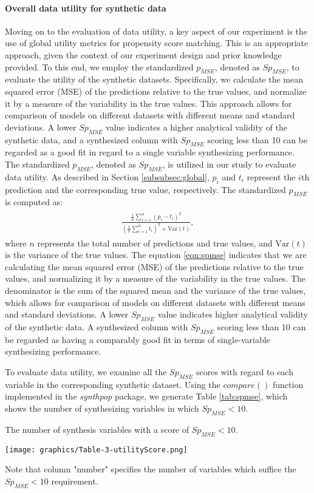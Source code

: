 \paragraph{Overall data utility for synthetic data}
Moving on to the evaluation of data utility, a key aspect of our experiment is the use of global utility metrics for propensity score matching. This is an appropriate approach, given the context of our experiment design and prior knowledge provided. To this end, we employ the standardized $p_{MSE}$, denoted as $Sp_{MSE}$, to evaluate the utility of the synthetic datasets. Specifically, we calculate the mean squared error (MSE) of the predictions relative to the true values, and normalize it by a measure of the variability in the true values. This approach allows for comparison of models on different datasets with different means and standard deviations. A lower $Sp_{MSE}$ value indicates a higher analytical validity of the synthetic data, and a synthesized column with $Sp_{MSE}$ scoring less than 10 can be regarded as a good fit in regard to a single variable synthesizing performance. The standardized $p_{MSE}$, denoted as $Sp_{MSE}$, is utilized in our study to evaluate data utility. As described in Section \ref{subsubsec:global}, $p_i$ and $t_i$ represent the $i$th prediction and the corresponding true value, respectively. The standardized $p_{MSE}$ is computed as:
\begin{align}
\label{eqn:spmse}
\begin{split}
    \frac{\frac{1}{n} \sum_{i=1}^n (p_i - t_i)^2}{\left(\frac{1}{n} \sum_{i=1}^n t_i\right)^2 + \text{Var}(t)},
\end{split}
\end{align}
where $n$ represents the total number of predictions and true values, and $\text{Var}(t)$ is the variance of the true values. The equation \eqref{eqn:spmse} indicates that we are calculating the mean squared error (MSE) of the predictions relative to the true values, and normalizing it by a measure of the variability in the true values. The denominator is the sum of the squared mean and the variance of the true values, which allows for comparison of models on different datasets with different means and standard deviations. A lower $Sp_{MSE}$ value indicates higher analytical validity of the synthetic data. A synthesized column with $Sp_{MSE}$ scoring less than 10 can be regarded as having a comparably good fit in terms of single-variable synthesizing performance.

To evaluate data utility, we examine all the $Sp_{MSE}$ scores with regard to each variable in the corresponding synthetic dataset. Using the $compare()$ function implemented in the \textit{synthpop} package, we generate Table \ref{tab:spmse}, which shows the number of synthesizing variables in which $Sp_{MSE}<10$.
\begin{table}[H]
\centering
  \caption{The number of synthesis variables with a score of $Sp_{MSE}<10$.}
  \label{tab:spmse}
  \texttt{[image: graphics/Table-3-utilityScore.png]}
    {\parbox{5.5in}{
    \footnotesize Note that column "number" specifies the number of variables which suffice the $Sp_{MSE}<10$ requirement.}
    }
\end{table}

